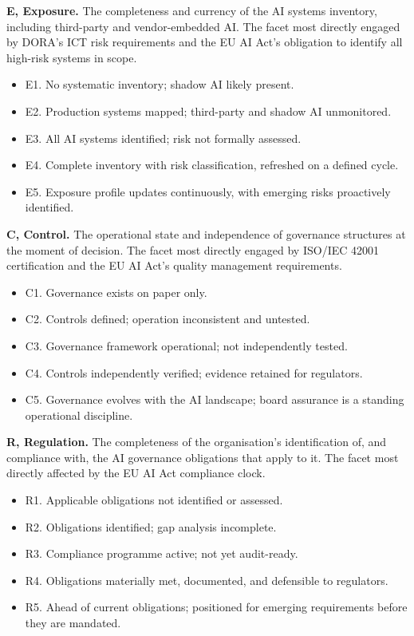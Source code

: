 \textbf{E, Exposure.} The completeness and currency of the AI systems inventory, including third-party and vendor-embedded AI. The facet most directly engaged by DORA's ICT risk requirements and the EU AI Act's obligation to identify all high-risk systems in scope.

\begin{itemize}
\tightlist
\item
  E1. No systematic inventory; shadow AI likely present.
\item
  E2. Production systems mapped; third-party and shadow AI unmonitored.
\item
  E3. All AI systems identified; risk not formally assessed.
\item
  E4. Complete inventory with risk classification, refreshed on a defined cycle.
\item
  E5. Exposure profile updates continuously, with emerging risks proactively identified.
\end{itemize}

\textbf{C, Control.} The operational state and independence of governance structures at the moment of decision. The facet most directly engaged by ISO/IEC 42001 certification and the EU AI Act's quality management requirements.

\begin{itemize}
\tightlist
\item
  C1. Governance exists on paper only.
\item
  C2. Controls defined; operation inconsistent and untested.
\item
  C3. Governance framework operational; not independently tested.
\item
  C4. Controls independently verified; evidence retained for regulators.
\item
  C5. Governance evolves with the AI landscape; board assurance is a standing operational discipline.
\end{itemize}

\textbf{R, Regulation.} The completeness of the organisation's identification of, and compliance with, the AI governance obligations that apply to it. The facet most directly affected by the EU AI Act compliance clock.

\begin{itemize}
\tightlist
\item
  R1. Applicable obligations not identified or assessed.
\item
  R2. Obligations identified; gap analysis incomplete.
\item
  R3. Compliance programme active; not yet audit-ready.
\item
  R4. Obligations materially met, documented, and defensible to regulators.
\item
  R5. Ahead of current obligations; positioned for emerging requirements before they are mandated.
\end{itemize}

